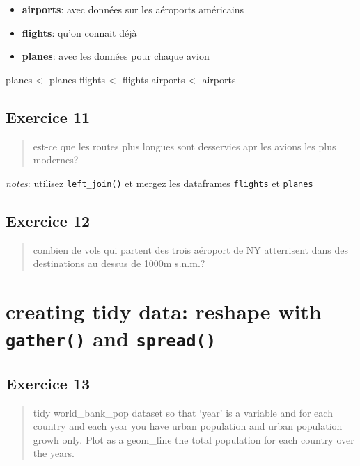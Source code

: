 \documentclass[
]{article}
\newenvironment{Shaded}{\begin{snugshade}}{\end{snugshade}}
\newcommand{\NormalTok}[1]{#1}
\newcommand{\StringTok}[1]{\textcolor[rgb]{0.31,0.60,0.02}{#1}}
\providecommand{\tightlist}{%
  \setlength{\itemsep}{0pt}\setlength{\parskip}{0pt}}
\begin{document}
\begin{itemize}
\tightlist
\item
  \textbf{airports}: avec données sur les aéroports américains
\item
  \textbf{flights}: qu'on connait déjà
\item
  \textbf{planes}: avec les données pour chaque avion
\end{itemize}

\begin{Shaded}
\begin{Highlighting}[]
\NormalTok{planes <-}\StringTok{ }\NormalTok{planes}
\NormalTok{flights <-}\StringTok{ }\NormalTok{flights}
\NormalTok{airports <-}\StringTok{ }\NormalTok{airports}
\end{Highlighting}
\end{Shaded}

\hypertarget{exercice-11}{%
\subsection{Exercice 11}\label{exercice-11}}

\begin{quote}
est-ce que les routes plus longues sont desservies apr les avions les
plus modernes?
\end{quote}

\emph{notes}: utilisez \texttt{left\_join()} et mergez les dataframes
\texttt{flights} et \texttt{planes}

\hypertarget{exercice-12}{%
\subsection{Exercice 12}\label{exercice-12}}

\begin{quote}
combien de vols qui partent des trois aéroport de NY atterrisent dans
des destinations au dessus de 1000m s.n.m.?
\end{quote}

\hypertarget{creating-tidy-data-reshape-with-gather-and-spread}{%
\section{\texorpdfstring{creating tidy data: reshape with
\texttt{gather()} and
\texttt{spread()}}{creating tidy data: reshape with gather() and spread()}}\label{creating-tidy-data-reshape-with-gather-and-spread}}

\hypertarget{exercice-13}{%
\subsection{Exercice 13}\label{exercice-13}}

\begin{quote}
tidy world\_bank\_pop dataset so that `year' is a variable and for each
country and each year you have urban population and urban population
growh only. Plot as a geom\_line the total population for each country
over the years.
\end{quote}
\end{document}
